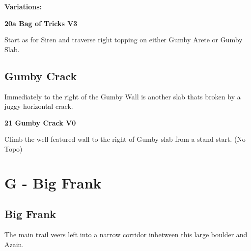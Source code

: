 \begin{multicols}{2}
				\begin{adjustwidth}{0.5cm}{}				
				\needspace{3cm}
				\textbf{Variations:} \newline
					
					\needspace{1.5cm}
\label{vr:Bag of Tricks}
\colorbox{green!20}{
\parbox{0.95\linewidth}{
\textbf{
20a Bag of Tricks V3  
}}}

					\begin{adjustwidth}{0.5cm}{}			
					Start as for Siren and traverse right topping on either Gumby Arete or Gumby Slab.
					\end{adjustwidth}
					
					
				\end{adjustwidth}
			
		
		
		\needspace{1.5cm}
		\subsection*{Gumby Crack}\label{bf:Gumby Crack}
		Immediately to the right of the Gumby Wall is another slab thats broken by a juggy horizontal crack.\\
	
		
			
			\needspace{1.5cm}
\label{rt:Gumby Crack}
\colorbox{green!20}{
\parbox{0.95\linewidth}{
\textbf{
21 Gumby Crack V0  
}}}

			\begin{adjustwidth}{0.5cm}{}			
			Climb the well featured wall to the right of Gumby slab from a stand start. (No Topo)
			\end{adjustwidth}
			
			
		
	
\newpage


		\section{G - Big Frank}\label{sa:Big Frank}
	
	
	
		
		\needspace{1.5cm}
		\subsection*{Big Frank}\label{bf:Big Frank}
		The main trail veers left into a narrow corridor inbetween this large boulder and Azain.\\
	
		
			

\end{multicols}
